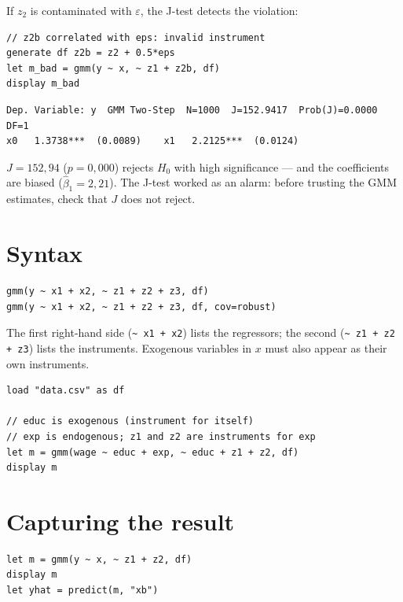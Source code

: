 If $z_2$ is contaminated with $\varepsilon$, the J-test detects the violation:

\begin{lstlisting}[caption={Invalid instrument --- J-test rejects}]
// z2b correlated with eps: invalid instrument
generate df z2b = z2 + 0.5*eps
let m_bad = gmm(y ~ x, ~ z1 + z2b, df)
display m_bad
\end{lstlisting}

\begin{lstlisting}[language={}, basicstyle=\ttfamily\scriptsize,
  frame=none, numbers=none, backgroundcolor=\color{codbg},
  xleftmargin=0pt, xrightmargin=0pt, breaklines=false]
Dep. Variable: y  GMM Two-Step  N=1000  J=152.9417  Prob(J)=0.0000  DF=1
x0   1.3738***  (0.0089)    x1   2.2125***  (0.0124)
\end{lstlisting}

$J = 152{,}94$ ($p = 0{,}000$) rejects $H_0$ with high significance --- and the
coefficients are biased ($\hat\beta_1 = 2{,}21$). The J-test worked as an
alarm: before trusting the GMM estimates, check that $J$ does not reject.

\section{Syntax}

\begin{lstlisting}
gmm(y ~ x1 + x2, ~ z1 + z2 + z3, df)
gmm(y ~ x1 + x2, ~ z1 + z2 + z3, df, cov=robust)
\end{lstlisting}

The first right-hand side (\lstinline{~ x1 + x2}) lists the regressors;
the second (\lstinline{~ z1 + z2 + z3}) lists the instruments. Exogenous
variables in $x$ must also appear as their own instruments.

\begin{lstlisting}[caption={Typical workflow with included exogenous variable}]
load "data.csv" as df

// educ is exogenous (instrument for itself)
// exp is endogenous; z1 and z2 are instruments for exp
let m = gmm(wage ~ educ + exp, ~ educ + z1 + z2, df)
display m
\end{lstlisting}

\section{Capturing the result}

\begin{lstlisting}
let m = gmm(y ~ x, ~ z1 + z2, df)
display m
let yhat = predict(m, "xb")
\end{lstlisting}
